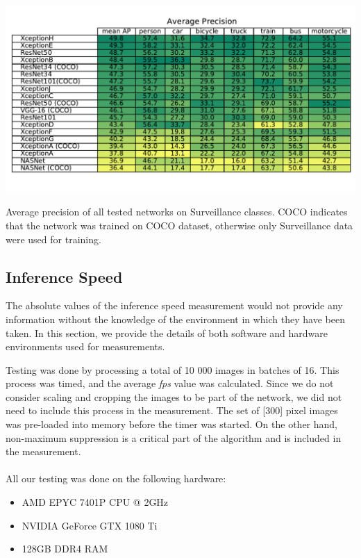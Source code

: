 \begin{table}
    \centering
    \includegraphics[width=\textwidth]{img/ap}
    \caption[Average precision of all tested networks on Surveillance classes]{Average precision of all tested networks on Surveillance classes. COCO indicates that the network was trained on COCO dataset, otherwise only Surveillance data were used for training.} 
    \label{tab:ap}
\end{table}

\subsection{Inference Speed}
The absolute values of the inference speed measurement would not provide any information without the knowledge of the environment in which they have been taken. In this section, we provide the details of both software and hardware environments used for measurements.

Testing was done by processing a total of 10 000 images in batches of 16. This process was timed, and the average \textit{fps} value was calculated.  Since we do not consider scaling and cropping the images to be part of the network, we did not need to include this process in the measurement. The set of [300] pixel images was pre-loaded into memory before the timer was started. On the other hand, non-maximum suppression is a critical part of the algorithm and is included in the measurement. 

\paragraph{}
\noindent All our testing was done on the following hardware:
\begin{itemize}
    \item AMD EPYC 7401P CPU @ 2GHz 
    \item NVIDIA GeForce GTX 1080 Ti
    \item 128GB DDR4 RAM
\end{itemize}



